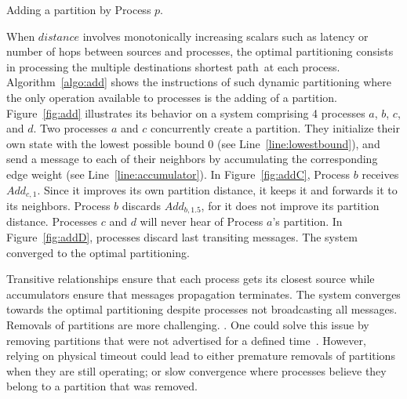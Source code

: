 \begin{algorithm}
  
  \caption{\label{algo:add}Adding a partition by Process $p$.}
\end{algorithm}

When $distance$ involves monotonically increasing scalars such as
latency or number of hops between sources and processes, the optimal
partitioning consists in processing the multiple destinations shortest
path~\REF at each process.  Algorithm~\ref{algo:add} shows the
instructions of such dynamic partitioning where the only operation
available to processes is the adding of a
partition. Figure~\ref{fig:add} illustrates its behavior on a system
comprising 4 processes $a$, $b$, $c$, and $d$. Two processes $a$ and
$c$ concurrently create a partition. They initialize their own state
with the lowest possible bound $0$ (see Line~\ref{line:lowestbound}),
and send a message to each of their neighbors by accumulating the
corresponding edge weight (see Line~\ref{line:accumulator}). In
Figure~\ref{fig:addC}, Process $b$ receives $Add_{c, 1}$. Since it
improves its own partition distance, it keeps it and forwards it to
its neighbors. Process $b$ discards $Add_{b, 1.5}$, for it does not
improve its partition distance. Processes $c$ and $d$ will never hear
of Process $a$'s partition.  In Figure~\ref{fig:addD},
processes discard last transiting messages. The system converged to
the optimal partitioning.

Transitive relationships ensure that each process gets its closest
source while accumulators ensure that messages propagation
terminates. The system converges towards the optimal partitioning
despite processes not broadcasting all messages. Removals of
partitions are more challenging.  . One could solve this
issue by removing partitions that were not advertised for a defined
time~\REF. However, relying on physical timeout could lead to either
premature removals of partitions when they are still operating; or
slow convergence where processes believe they belong to a partition
that was removed.


